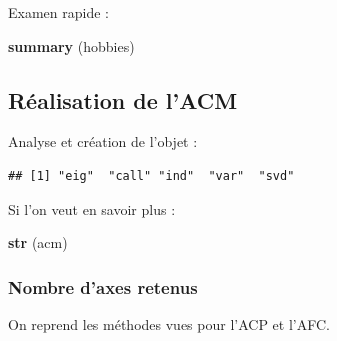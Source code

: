 \documentclass[]{book}
\newenvironment{Shaded}{\begin{snugshade}}{\end{snugshade}}
\newcommand{\CommentTok}[1]{\textcolor[rgb]{0.56,0.35,0.01}{\textit{#1}}}
\newcommand{\DataTypeTok}[1]{\textcolor[rgb]{0.13,0.29,0.53}{#1}}
\newcommand{\DecValTok}[1]{\textcolor[rgb]{0.00,0.00,0.81}{#1}}
\newcommand{\KeywordTok}[1]{\textcolor[rgb]{0.13,0.29,0.53}{\textbf{#1}}}
\newcommand{\NormalTok}[1]{#1}
\newcommand{\OperatorTok}[1]{\textcolor[rgb]{0.81,0.36,0.00}{\textbf{#1}}}
\newcommand{\StringTok}[1]{\textcolor[rgb]{0.31,0.60,0.02}{#1}}
\begin{document}
Examen rapide :

\begin{Shaded}
\begin{Highlighting}[]
\KeywordTok{summary}\NormalTok{ (hobbies)}
\end{Highlighting}
\end{Shaded}

\hypertarget{realisation-de-lacm}{%
\subsection{Réalisation de l'ACM}\label{realisation-de-lacm}}

Analyse et création de l'objet :

\begin{Shaded}
\end{Shaded}

\begin{verbatim}
## [1] "eig"  "call" "ind"  "var"  "svd"
\end{verbatim}

Si l'on veut en savoir plus :

\begin{Shaded}
\begin{Highlighting}[]
\KeywordTok{str}\NormalTok{ (acm)}
\end{Highlighting}
\end{Shaded}

\hypertarget{nombre-daxes-retenus}{%
\subsubsection{Nombre d'axes retenus}\label{nombre-daxes-retenus}}

On reprend les méthodes vues pour l'ACP et l'AFC.

\begin{Shaded}
\end{Shaded}
\end{document}
